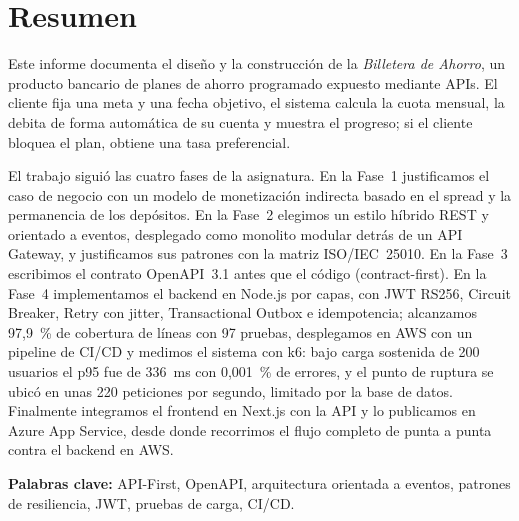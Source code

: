 \chapter*{Resumen}

Este informe documenta el diseño y la construcción de la \emph{Billetera de Ahorro}, un producto bancario de planes de ahorro programado expuesto mediante APIs. El cliente fija una meta y una fecha objetivo, el sistema calcula la cuota mensual, la debita de forma automática de su cuenta y muestra el progreso; si el cliente bloquea el plan, obtiene una tasa preferencial.

El trabajo siguió las cuatro fases de la asignatura. En la Fase~1 justificamos el caso de negocio con un modelo de monetización indirecta basado en el spread y la permanencia de los depósitos. En la Fase~2 elegimos un estilo híbrido REST y orientado a eventos, desplegado como monolito modular detrás de un API Gateway, y justificamos sus patrones con la matriz ISO/IEC~25010. En la Fase~3 escribimos el contrato OpenAPI~3.1 antes que el código (contract-first). En la Fase~4 implementamos el backend en Node.js por capas, con JWT RS256, Circuit Breaker, Retry con jitter, Transactional Outbox e idempotencia; alcanzamos 97,9~\% de cobertura de líneas con 97 pruebas, desplegamos en AWS con un pipeline de CI/CD y medimos el sistema con k6: bajo carga sostenida de 200 usuarios el p95 fue de 336~ms con 0,001~\% de errores, y el punto de ruptura se ubicó en unas 220 peticiones por segundo, limitado por la base de datos. Finalmente integramos el frontend en Next.js con la API y lo publicamos en Azure App Service, desde donde recorrimos el flujo completo de punta a punta contra el backend en AWS.

\medskip
\textbf{Palabras clave:} API-First, OpenAPI, arquitectura orientada a eventos, patrones de resiliencia, JWT, pruebas de carga, CI/CD.
